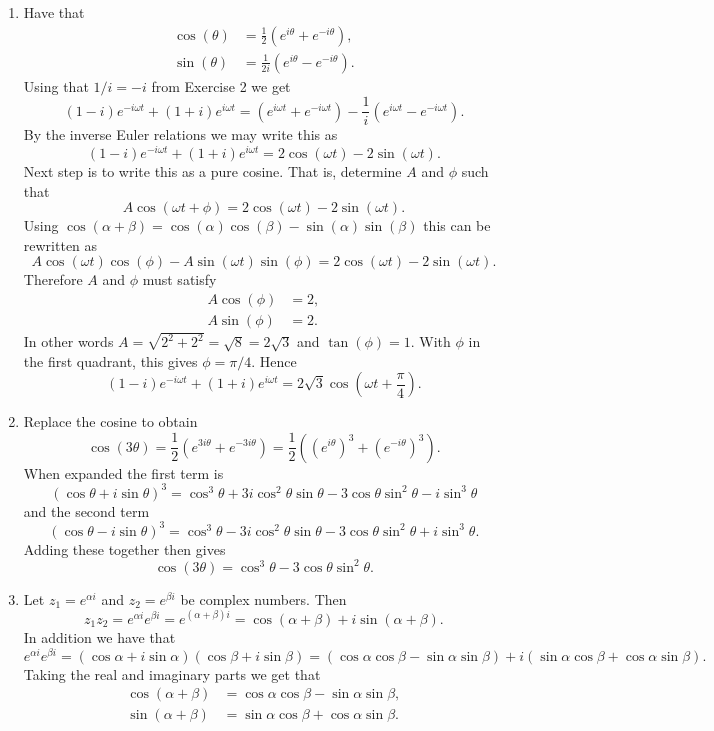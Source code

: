 \begin{enumerate}


\item Have that 
\begin{align*}
    \cos(\theta)&=\frac{1}{2}(e^{i\theta}+e^{-i\theta}), \\
    \sin(\theta)&=\frac{1}{2i}(e^{i\theta}-e^{-i\theta}).
\end{align*}
Using that $1/i=-i$ from Exercise 2 we get
$$(1-i)e^{-i\omega t}+(1+i)e^{i\omega t}=(e^{i\omega t}+e^{-i\omega t})-\frac{1}{i}(e^{i\omega t}-e^{-i\omega t}).$$
By the inverse Euler relations we may write this as
$$(1-i)e^{-i\omega t}+(1+i)e^{i\omega t}=2\cos(\omega t)-2\sin(\omega t).$$
Next step is to write this as a pure cosine. That is, determine $A$ and $\phi$ such that 
$$A\cos(\omega t+\phi)=2\cos(\omega t)-2\sin(\omega t).$$
Using $\cos(\alpha+\beta)=\cos(\alpha)\cos(\beta)-\sin(\alpha)\sin(\beta)$ this can be rewritten as
$$A\cos(\omega t)\cos(\phi)-A\sin(\omega t)\sin(\phi)=2\cos(\omega t)-2\sin(\omega t).$$
Therefore $A$ and $\phi$ must satisfy
\begin{align*}
    A\cos(\phi)&=2, \\
    A\sin(\phi)&=2.
\end{align*}
In other words $A=\sqrt{2^{2}+2^{2}}=\sqrt{8}=2\sqrt{3}$ and $\tan(\phi)=1$. With $\phi$ in the first quadrant, this gives $\phi=\pi/4$. Hence
$$(1-i)e^{-i\omega t}+(1+i)e^{i\omega t}=2\sqrt{3}\cos\left(\omega t+\frac{\pi}{4}\right).$$

\item Replace the cosine to obtain
$$\cos(3\theta)=\frac{1}{2}(e^{3i\theta}+e^{-3i\theta})=\frac{1}{2}((e^{i\theta})^{3}+(e^{-i\theta})^{3}).$$
When expanded the first term is
$$(\cos\theta+i\sin\theta)^{3}=\cos^{3}\theta+3i\cos^{2}\theta\sin\theta-3\cos\theta\sin^{2}\theta-i\sin^{3}\theta$$
and the second term
$$(\cos\theta-i\sin\theta)^{3}=\cos^{3}\theta-3i\cos^{2}\theta\sin\theta-3\cos\theta\sin^{2}\theta+i\sin^{3}\theta.$$
Adding these together then gives
$$\cos(3\theta)=\cos^{3}\theta-3\cos\theta\sin^{2}\theta.$$

\item Let $z_{1}=e^{\alpha i}$ and $z_{2}=e^{\beta i}$ be complex numbers. Then
$$z_{1}z_{2}=e^{\alpha i}e^{\beta i}=e^{(\alpha+\beta)i}=\cos(\alpha+\beta)+i\sin(\alpha+\beta).$$
In addition we have that
$$e^{\alpha i}e^{\beta i}=(\cos\alpha+i\sin\alpha)(\cos\beta+i\sin\beta)=(\cos\alpha\cos\beta-\sin\alpha\sin\beta)+i(\sin\alpha\cos\beta+\cos\alpha\sin\beta).$$
Taking the real and imaginary parts we get that
\begin{align*}
    \cos(\alpha+\beta)&=\cos\alpha\cos\beta-\sin\alpha\sin\beta, \\
    \sin(\alpha+\beta)&=\sin\alpha\cos\beta+\cos\alpha\sin\beta.
\end{align*}


\end{enumerate}
